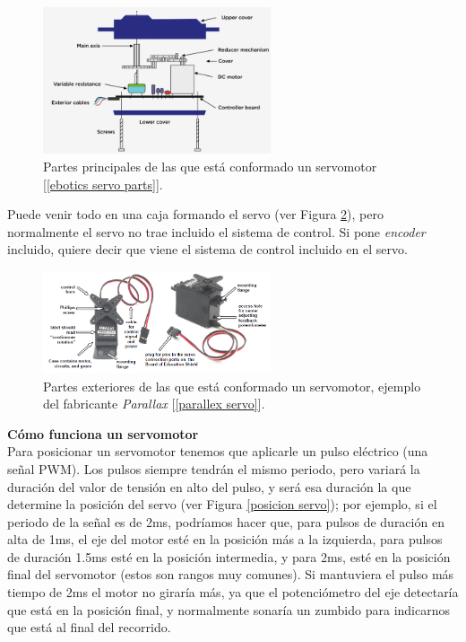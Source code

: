 \documentclass[12pt]{article}
\begin{document}
	\begin{figure}[h]
		\begin{center}
			\includegraphics[width=0.6\textwidth]{img/servo_parts.png}
			\caption{Partes principales de las que está conformado un servomotor [\ref{ebotics servo parts}].}
			\label{servo parts}
		\end{center}
	\end{figure}

	\pagebreak

	\noindent Puede venir todo en una caja formando el servo (ver Figura \ref{parallex labels parts}), pero normalmente el servo no trae incluido el sistema de control. Si pone \textit{encoder} incluido, quiere decir que viene el sistema de control incluido en el servo. \\
	
	\begin{figure}[h]
		\begin{center}
			\includegraphics[width=0.6\textwidth]{img/servo_labels.png}
			\caption{Partes exteriores de las que está conformado un servomotor, ejemplo del fabricante \textit{Parallax} [\ref{parallex servo}].}
			\label{parallex labels parts}
		\end{center}
	\end{figure}

	\noindent \textbf{Cómo funciona un servomotor}\\
	
	\noindent Para posicionar un servomotor tenemos que aplicarle un pulso eléctrico (una señal PWM). Los pulsos siempre tendrán el mismo periodo, pero variará la duración del valor de tensión en alto del pulso, y será esa duración la que determine la posición del servo (ver Figura \ref{posicion servo}); por ejemplo, si el periodo de la señal es de 2ms, podríamos hacer que, para pulsos de duración en alta de 1ms, el eje del motor esté en la posición más a la izquierda, para pulsos de duración 1.5ms esté en la posición intermedia, y para 2ms, esté en la posición final del servomotor (estos son rangos muy comunes). Si mantuviera el pulso más tiempo de 2ms el motor no giraría más, ya que el potenciómetro del eje detectaría que está en la posición final, y normalmente sonaría un zumbido para indicarnos que está al final del recorrido. \\
	
\end{document}
